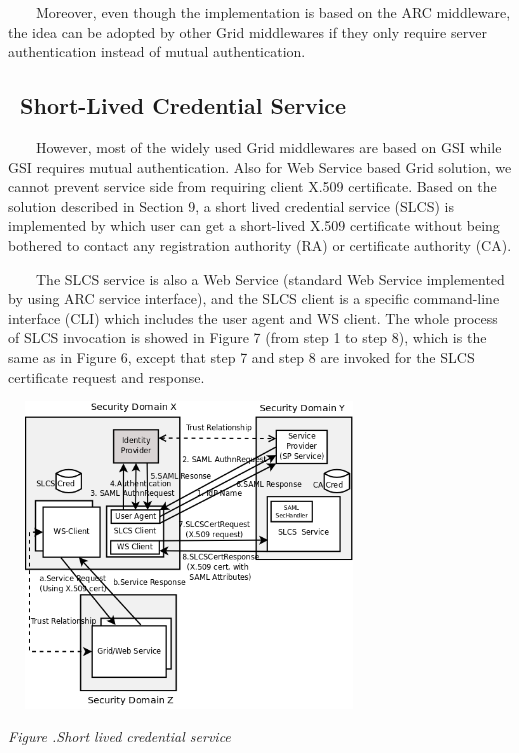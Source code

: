 \documentclass[a4paper]{article}
\newcounter{Figure}
\renewcommand\theFigure{\arabic{Figure}}
\begin{document}
{\upshape\color{black}
\ \ \ \ Moreover, even though the implementation is based on the ARC
middleware, the idea can be adopted by other Grid middlewares if they
only require server authentication instead of mutual authentication.}


\bigskip

\subsection[\ Short{}-Lived Credential
Service]{\foreignlanguage{english}{\ }Short-Lived Credential Service}
{\color{black}
\ \ \ \ However, most of the widely used Grid middlewares are based on
GSI while GSI requires mutual authentication. Also for Web Service
based Grid solution, we cannot prevent service side from requiring
client X.509 certificate. Based on the solution described in Section 9,
a short lived credential service (SLCS) is implemented by which user
can get a short-lived X.509 certificate without being bothered to
contact any registration authority (RA) or certificate authority (CA).}

{\color{black}
\ \ \ \ The SLCS service is also a Web Service (standard Web Service
implemented by using ARC service interface), and the SLCS client is a
specific command-line interface (CLI) which includes the user agent and
WS client. The whole process of SLCS invocation is showed in Figure 7
(from step 1 to step 8), which is the same as in Figure 6, except that
step 7 and step 8 are invoked for the SLCS certificate request and
response.}



\begin{center}
\includegraphics[width=3.7689in,height=3.2055in]{SecurityFrameworkofARC1-img8.png}
\end{center}
{\centering{}\itshape\color{black}
Figure \stepcounter{Figure}{\theFigure}.Short lived credential service
\par}
\end{document}
